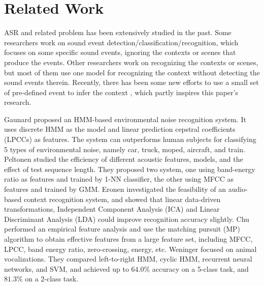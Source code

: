 \section{Related Work}
\label{sec:related}


ASR and related problem has been extensively studied in the past.
Some researchers work on sound event detection/classification/recognition,
which focuses on some specific sound events, ignoring the
contexts or scenes that produce the events. Other researchers
work on recognizing the contexts or scenes, but most of them use one model for
recognizing the context without detecting the sound events therein.
Recently, there has been some new efforts to use a
small set of pre-defined event to infer the context \cite{heittola2010audio},
which partly inspires this paper's research.


Gaunard \et{} proposed an HMM-based environmental noise recognition system. It uses discrete HMM as the model and linear prediction 
cepstral coefficients (LPCCs) as features. 
The system can outperforms human subjects for classifying 5 types 
of environmental noise, namely car, truck, moped, aircraft, and train.
Peltonen \et{} studied the efficiency of different acoustic 
features, models, and the effect of test sequence length. 
They proposed two system, %
one using band-energy ratio as features and trained by 1-NN classifier, 
the other using MFCC as features and trained by GMM. 
Eronen \et{} investigated the feasibility of an audio-based 
context recognition system, and showed that linear data-driven transformations, 
\ie Independent Component Analysis (ICA) and Linear Discriminant Analysis (LDA) 
could improve recognition accuracy slightly. 
Chu \et{} performed an empirical feature analysis and 
use the matching pursuit (MP) algorithm to obtain effective features from 
a large feature set, including MFCC, LPCC, band energy ratio, 
zero-crossing, energy, etc. 
Weninger \et{} focused on animal vocalizations. 
They compared left-to-right HMM, cyclic HMM, recurrent neural networks, 
and SVM, and achieved up to $64.0\%$ accuracy on a 5-class task, 
and $81.3\%$ on a 2-class task.

